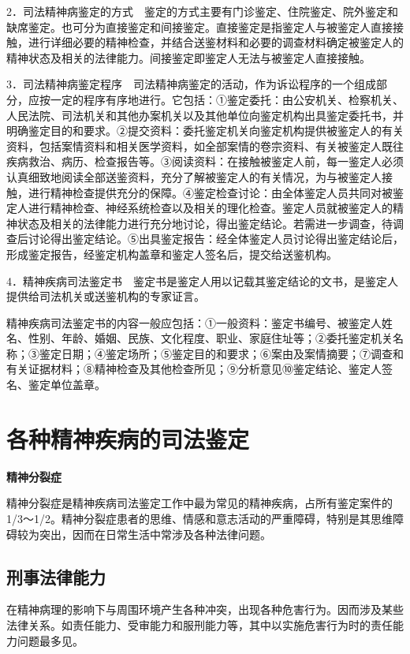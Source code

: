 2．司法精神病鉴定的方式　鉴定的方式主要有门诊鉴定、住院鉴定、院外鉴定和缺席鉴定。也可分为直接鉴定和间接鉴定。直接鉴定是指鉴定人与被鉴定人直接接触，进行详细必要的精神检查，并结合送鉴材料和必要的调查材料确定被鉴定人的精神状态及相关的法律能力。间接鉴定即鉴定人无法与被鉴定人直接接触。

3．司法精神病鉴定程序　司法精神病鉴定的活动，作为诉讼程序的一个组成部分，应按一定的程序有序地进行。它包括：①鉴定委托：由公安机关、检察机关、人民法院、司法机关和其他办案机关以及其他单位向鉴定机构出具鉴定委托书，并明确鉴定目的和要求。②提交资料：委托鉴定机关向鉴定机构提供被鉴定人的有关资料，包括案情资料和相关医学资料，如全部案情的卷宗资料、有关被鉴定人既往疾病救治、病历、检查报告等。③阅读资料：在接触被鉴定人前，每一鉴定人必须认真细致地阅读全部送鉴资料，充分了解被鉴定人的有关情况，为与被鉴定人接触，进行精神检查提供充分的保障。④鉴定检查讨论：由全体鉴定人员共同对被鉴定人进行精神检查、神经系统检查以及相关的理化检查。鉴定人员就被鉴定人的精神状态及相关的法律能力进行充分地讨论，得出鉴定结论。若需进一步调查，待调查后讨论得出鉴定结论。⑤出具鉴定报告：经全体鉴定人员讨论得出鉴定结论后，形成鉴定报告，经鉴定机构盖章和鉴定人签名后，提交给送鉴机构。

4．精神疾病司法鉴定书　鉴定书是鉴定人用以记载其鉴定结论的文书，是鉴定人提供给司法机关或送鉴机构的专家证言。

精神疾病司法鉴定书的内容一般应包括：①一般资料：鉴定书编号、被鉴定人姓名、性别、年龄、婚姻、民族、文化程度、职业、家庭住址等；②委托鉴定机关名称；③鉴定日期；④鉴定场所；⑤鉴定目的和要求；⑥案由及案情摘要；⑦调查和有关证据材料；⑧精神检查及其他检查所见；⑨分析意见⑩鉴定结论、鉴定人签名、鉴定单位盖章。

\section{各种精神疾病的司法鉴定}

\textbf{精神分裂症}

精神分裂症是精神疾病司法鉴定工作中最为常见的精神疾病，占所有鉴定案件的1/3～1/2。精神分裂症患者的思维、情感和意志活动的严重障碍，特别是其思维障碍较为突出，因而在日常生活中常涉及各种法律问题。

\subsection{刑事法律能力}

在精神病理的影响下与周围环境产生各种冲突，出现各种危害行为。因而涉及某些法律关系。如责任能力、受审能力和服刑能力等，其中以实施危害行为时的责任能力问题最多见。

